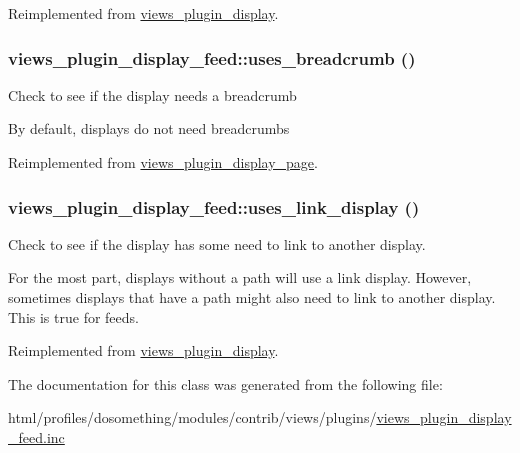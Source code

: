 Reimplemented from \hyperlink{classviews__plugin__display_acf230a4b44b452c9469f5df92e58e32e}{views\_\-plugin\_\-display}.\hypertarget{classviews__plugin__display__feed_a4bc729e21f5578c13d420bbaf3c388c5}{
\subsubsection[{uses\_\-breadcrumb}]{\setlength{\rightskip}{0pt plus 5cm}views\_\-plugin\_\-display\_\-feed::uses\_\-breadcrumb ()}}
\label{classviews__plugin__display__feed_a4bc729e21f5578c13d420bbaf3c388c5}
Check to see if the display needs a breadcrumb

By default, displays do not need breadcrumbs 

Reimplemented from \hyperlink{classviews__plugin__display__page_acbdafb32168f809b28e083d654399f3f}{views\_\-plugin\_\-display\_\-page}.\hypertarget{classviews__plugin__display__feed_aa61e05dca3b82b696f6ea10356873a8b}{
\subsubsection[{uses\_\-link\_\-display}]{\setlength{\rightskip}{0pt plus 5cm}views\_\-plugin\_\-display\_\-feed::uses\_\-link\_\-display ()}}
\label{classviews__plugin__display__feed_aa61e05dca3b82b696f6ea10356873a8b}
Check to see if the display has some need to link to another display.

For the most part, displays without a path will use a link display. However, sometimes displays that have a path might also need to link to another display. This is true for feeds. 

Reimplemented from \hyperlink{classviews__plugin__display_a64d6d3c0e51efde2e050d36fbd3457dc}{views\_\-plugin\_\-display}.

The documentation for this class was generated from the following file:\begin{DoxyCompactItemize}
\item 
html/profiles/dosomething/modules/contrib/views/plugins/\hyperlink{views__plugin__display__feed_8inc}{views\_\-plugin\_\-display\_\-feed.inc}\end{DoxyCompactItemize}
